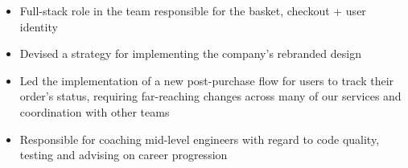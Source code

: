 \bigbreak
\begin{itemize}
    \item Full-stack role in the team responsible for the basket, checkout + user identity
    \item Devised a strategy for implementing the company's rebranded design
    \item Led the implementation of a new post-purchase flow for users to track their order's status, requiring far-reaching changes across many of our services and coordination with other teams
    \item Responsible for coaching mid-level engineers with regard to code quality, testing and advising on career progression
\end{itemize}